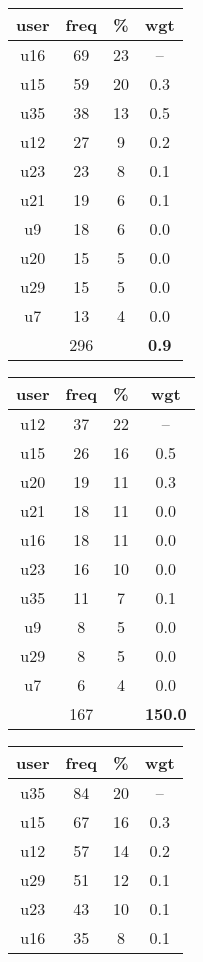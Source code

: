 \begin{table}
\centering
\begin{tabular}{ |c|c|c|c| }
	\hline
	\textbf{user} & \textbf{freq} & \textbf{\%} & \textbf{wgt} \\
	\hline
	u16 & 69 & 23 & -- \\
	u15 & 59 & 20 & 0.3 \\
	u35 & 38 & 13 & 0.5 \\
	u12 & 27 & 9 & 0.2 \\
	u23 & 23 & 8 & 0.1 \\
	u21 & 19 & 6 & 0.1 \\
	u9 & 18 & 6 & 0.0 \\
	u20 & 15 & 5 & 0.0 \\
	u29 & 15 & 5 & 0.0 \\
	u7 & 13 & 4 & 0.0 \\
	 & 296 & & \textbf{0.9} \\
	\hline
\end{tabular}
\begin{tabular}{ |c|c|c|c| }
	\hline
	\textbf{user} & \textbf{freq} & \textbf{\%} & \textbf{wgt} \\
	\hline
	u12 & 37 & 22 & -- \\
	u15 & 26 & 16 & 0.5 \\
	u20 & 19 & 11 & 0.3 \\
	u21 & 18 & 11 & 0.0 \\
	u16 & 18 & 11 & 0.0 \\
	u23 & 16 & 10 & 0.0 \\
	u35 & 11 & 7 & 0.1 \\
	u9 & 8 & 5 & 0.0 \\
	u29 & 8 & 5 & 0.0 \\
	u7 & 6 & 4 & 0.0 \\
	 & 167 & & \textbf{150.0} \\
	\hline
\end{tabular}
\begin{tabular}{ |c|c|c|c| }
	\hline
	\textbf{user} & \textbf{freq} & \textbf{\%} & \textbf{wgt} \\
	\hline
	u35 & 84 & 20 & -- \\
	u15 & 67 & 16 & 0.3 \\
	u12 & 57 & 14 & 0.2 \\
	u29 & 51 & 12 & 0.1 \\
	u23 & 43 & 10 & 0.1 \\
	u16 & 35 & 8 & 0.1 \\

\end{tabular}
\end{table}
